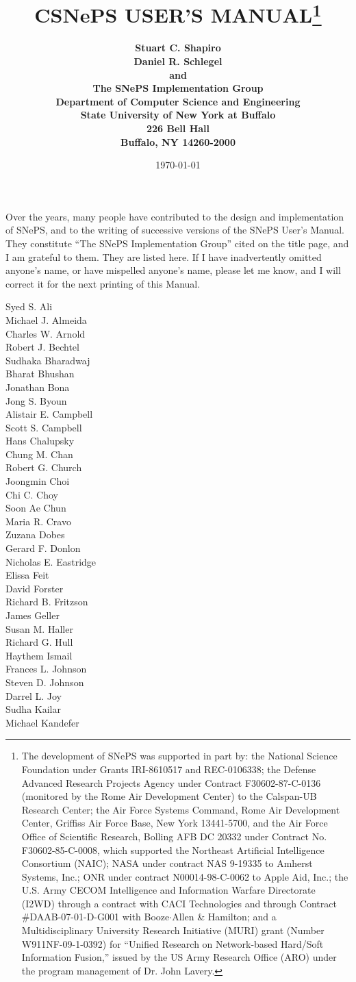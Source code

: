 \documentclass[letterpaper,colorlinks=true,linkcolor=blue]{book}
\title{\bf CSNePS USER'S MANUAL\thanks{The development of SNePS was supported
    in part by: the National Science Foundation under Grants IRI-8610517 and
    REC-0106338; the Defense Advanced Research Projects Agency under Contract
    F30602-87-C-0136 (monitored by the Rome Air Development Center) to the
    Calspan-UB Research Center; the Air Force Systems Command, Rome Air
    Development Center, Griffiss Air Force Base, New York 13441-5700, and the
    Air Force Office of Scientific Research, Bolling AFB DC 20332 under Contract
    No.  F30602-85-C-0008, which supported the Northeast Artificial Intelligence
    Consortium (NAIC); NASA under contract NAS 9-19335 to Amherst Systems, Inc.;
    ONR under contract N00014-98-C-0062 to Apple Aid, Inc.; the U.S. Army CECOM
    Intelligence and Information Warfare Directorate (I2WD) through a contract
    with CACI Technologies and through Contract \#DAAB-07-01-D-G001 with
    Booze$\cdot$Allen \& Hamilton; and a Multidisciplinary University Research
    Initiative (MURI) grant (Number W911NF-09-1-0392) for ``Unified Research on
    Network-based Hard/Soft Information Fusion,'' issued by the US Army Research
    Office (ARO) under the program management of Dr. John Lavery.}}
\author{ \bf
Stuart C. Shapiro \\ \bf
Daniel R. Schlegel \\ \bf
and \\ \bf
The SNePS Implementation Group \\[2ex] \bf
Department of Computer Science and Engineering\\ \bf
State University of New York at Buffalo \\ \bf
226 Bell Hall\\ \bf
Buffalo, NY 14260-2000 \\[2ex] \bf
\date{\today}}
\begin{document}
\frontmatter
\maketitle

\pagebreak
Over the years, many people have contributed to the design and
implementation of SNePS, and to the writing of successive versions of
the SNePS User's Manual.  They constitute ``The SNePS Implementation
Group'' cited on the title page, and I am grateful to them.  They are
listed here.  If I have inadvertently omitted anyone's name, or have
mispelled anyone's name, please let me know, and I will correct it for
the next printing of this Manual.
\begin{multicols}{3}
\noindent Syed S. Ali\\
Michael J. Almeida\\
Charles W. Arnold\\
Robert J. Bechtel\\
Sudhaka Bharadwaj\\
Bharat Bhushan\\
Jonathan Bona\\
Jong S. Byoun\\
Alistair E. Campbell\\
Scott S. Campbell\\
Hans Chalupsky\\
Chung M. Chan\\
Robert G. Church\\
Joongmin Choi\\
Chi C. Choy\\
Soon Ae Chun\\
Maria R. Cravo\\
Zuzana Dobes\\
Gerard F. Donlon\\
Nicholas E. Eastridge\\
Elissa Feit\\
David Forster\\
Richard B. Fritzson\\
James Geller\\
Susan M. Haller\\
Richard G. Hull\\
Haythem Ismail\\
Frances L. Johnson\\
Steven D. Johnson\\
Darrel L. Joy\\
Sudha Kailar\\
Michael Kandefer\\

\end{multicols}
\end{document}
